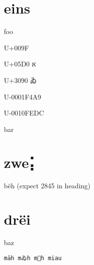 \documentclass{article}%
\begin{document}
\tableofcontents

\section{eins}

foo

U+009F 

U+05D0 א

U+3090 ゐ

U-0001F4A9 💩

U-0010FEDC 􏻜

bar

\section{zwe⡅}

bëh (expect 2845 in heading)

\section{drëi}

baz

\begin{lstlisting}
mäh mゐh m💩h miau
\end{lstlisting}
\end{document}
